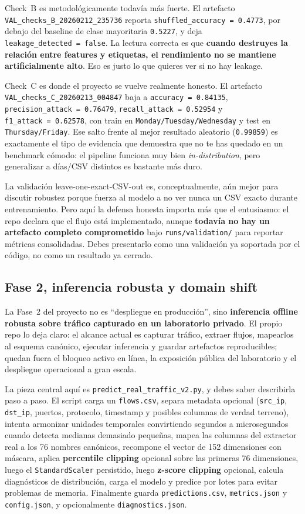 ﻿\documentclass[12pt,a4paper]{article}
\begin{document}
Check~B es metodológicamente todavía más fuerte. El artefacto
\texttt{VAL\_checks\_B\_20260212\_235736} reporta \texttt{shuffled\_accuracy~=~0.4773}, por debajo
del baseline de clase mayoritaria \texttt{0.5227}, y deja \texttt{leakage\_detected~=~false}. La
lectura correcta es que \textbf{cuando destruyes la relación entre features y etiquetas, el
rendimiento no se mantiene artificialmente alto}. Eso es justo lo que quieres ver si no hay
leakage.

Check~C es donde el proyecto se vuelve realmente honesto. El artefacto
\texttt{VAL\_checks\_C\_20260213\_004847} baja a \texttt{accuracy~=~0.84135},
\texttt{precision\_attack~=~0.76479}, \texttt{recall\_attack~=~0.52954} y
\texttt{f1\_attack~=~0.62578}, con train en \texttt{Monday/Tuesday/Wednesday} y test en
\texttt{Thursday/Friday}. Ese salto frente al mejor resultado aleatorio (\texttt{0.99859}) es
exactamente el tipo de evidencia que demuestra que no te has quedado en un benchmark cómodo: el
pipeline funciona muy bien \textit{in-distribution}, pero generalizar a días/CSV distintos es
bastante más duro.

La validación leave-one-exact-CSV-out es, conceptualmente, aún mejor para discutir robustez porque
fuerza al modelo a no ver nunca un CSV exacto durante entrenamiento. Pero aquí la defensa honesta
importa más que el entusiasmo: el repo declara que el flujo está implementado, aunque
\textbf{todavía no hay un artefacto completo comprometido} bajo \verb|runs/validation/| para
reportar métricas consolidadas. Debes presentarlo como una validación ya soportada por el código, no
como un resultado ya cerrado.

\subsection{Fase 2, inferencia robusta y domain shift}

La Fase~2 del proyecto no es ``despliegue en producción'', sino \textbf{inferencia offline robusta
sobre tráfico capturado en un laboratorio privado}. El propio repo lo deja claro: el alcance actual
es capturar tráfico, extraer flujos, mapearlos al esquema canónico, ejecutar inferencia y guardar
artefactos reproducibles; quedan fuera el bloqueo activo en línea, la exposición pública del
laboratorio y el despliegue operacional a gran escala.

La pieza central aquí es \verb|predict_real_traffic_v2.py|, y debes saber describirla paso a paso.
El script carga un \texttt{flows.csv}, separa metadata opcional (\texttt{src\_ip},
\texttt{dst\_ip}, puertos, protocolo, timestamp y posibles columnas de verdad terreno), intenta
armonizar unidades temporales convirtiendo segundos a microsegundos cuando detecta medianas
demasiado pequeñas, mapea las columnas del extractor real a los 76 nombres canónicos, recompone el
vector de 152 dimensiones con máscara, aplica \textbf{percentile clipping} opcional sobre las
primeras 76 dimensiones, luego el \texttt{StandardScaler} persistido, luego \textbf{z-score
clipping} opcional, calcula diagnósticos de distribución, carga el modelo y predice por lotes para
evitar problemas de memoria. Finalmente guarda \texttt{predictions.csv}, \texttt{metrics.json} y
\texttt{config.json}, y opcionalmente \texttt{diagnostics.json}.
\end{document}
